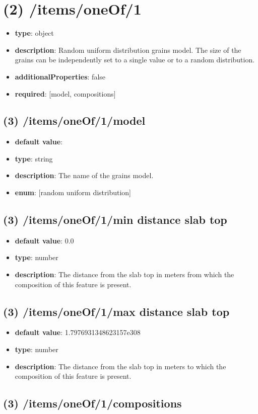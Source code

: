\section{(2) /items/oneOf/1}
\begin{itemize}[leftmargin=2em]\item {\bf type}: object
\item {\bf description}: Random uniform distribution grains model. The size of the grains can be independently set to a single value or to a random distribution.
\item {\bf additionalProperties}: false
\item {\bf required}: [model, compositions]\end{itemize}
\subsection{(3) /items/oneOf/1/model}
\begin{itemize}[leftmargin=3em]\item {\bf default value}: 
\item {\bf type}: string
\item {\bf description}: The name of the grains model.
\item {\bf enum}: [random uniform distribution]\end{itemize}\subsection{(3) /items/oneOf/1/min distance slab top}
\begin{itemize}[leftmargin=3em]\item {\bf default value}: 0.0
\item {\bf type}: number
\item {\bf description}: The distance from the slab top in meters from which the composition of this feature is present.
\end{itemize}\subsection{(3) /items/oneOf/1/max distance slab top}
\begin{itemize}[leftmargin=3em]\item {\bf default value}: 1.7976931348623157e308
\item {\bf type}: number
\item {\bf description}: The distance from the slab top in meters to which the composition of this feature is present.
\end{itemize}\subsection{(3) /items/oneOf/1/compositions}
